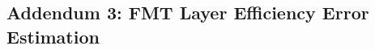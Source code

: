 \subsection*{Addendum 3: FMT Layer Efficiency Error Estimation}
\label{20.03::fmt_layer_efficiency_error_estimation}
